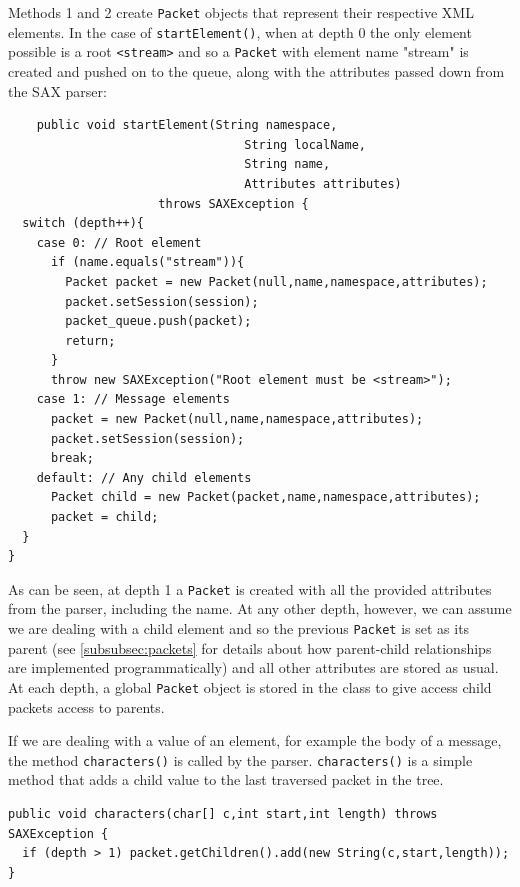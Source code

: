     Methods 1 and 2 create \verb!Packet! objects that represent their respective XML elements. In the case of \verb!startElement()!, when at depth 0 the only element possible is a root \verb!<stream>! and so a \verb!Packet! with element name "stream" is created and pushed on to the queue, along with the attributes passed down from the SAX parser: \\
    
    \begin{lstlisting}
    public void startElement(String namespace,
                                 String localName,
                                 String name,
                                 Attributes attributes)
                     throws SAXException {
  switch (depth++){
    case 0: // Root element
      if (name.equals("stream")){
        Packet packet = new Packet(null,name,namespace,attributes);
        packet.setSession(session);
        packet_queue.push(packet);
        return;
      }
      throw new SAXException("Root element must be <stream>");
    case 1: // Message elements
      packet = new Packet(null,name,namespace,attributes);
      packet.setSession(session);
      break;
    default: // Any child elements
      Packet child = new Packet(packet,name,namespace,attributes);
      packet = child;
  }
}
    \end{lstlisting}
    
    As can be seen, at depth 1 a \verb!Packet! is created with all the provided attributes from the parser, including the name. At any other depth, however, we can assume we are dealing with a child element and so the previous \verb!Packet! is set as its parent (see \textsection\ref{subsubsec:packets} for details about how parent-child relationships are implemented programmatically) and all other attributes are stored as usual. At each depth, a global \verb!Packet! object is stored in the class to give access child packets access to parents.
    
    If we are dealing with a value of an element, for example the body of a message, the method \verb!characters()! is called by the parser. \verb!characters()! is a simple method that adds a child value to the last traversed packet in the tree. \\
    
    \begin{lstlisting}
public void characters(char[] c,int start,int length) throws SAXException {
  if (depth > 1) packet.getChildren().add(new String(c,start,length));
}
    \end{lstlisting}
    
